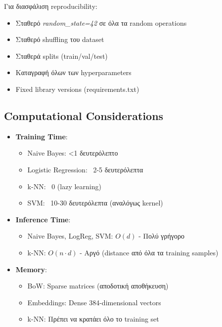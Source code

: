 \documentclass[12pt,a4paper,twoside]{book}
\begin{document}
Για διασφάλιση reproducibility:

\begin{itemize}
    \item Σταθερό \textit{random\_state=42} σε όλα τα random operations
    \item Σταθερό shuffling του dataset
    \item Σταθερά splits (train/val/test)
    \item Καταγραφή όλων των hyperparameters
    \item Fixed library versions (requirements.txt)
\end{itemize}

\subsection{Computational Considerations}

\begin{itemize}
    \item \textbf{Training Time}:
          \begin{itemize}
              \item Naive Bayes: <1 δευτερόλεπτο
              \item Logistic Regression: ~2-5 δευτερόλεπτα
              \item k-NN: ~0 (lazy learning)
              \item SVM: ~10-30 δευτερόλεπτα (αναλόγως kernel)
          \end{itemize}

    \item \textbf{Inference Time}:
          \begin{itemize}
              \item Naive Bayes, LogReg, SVM: \(O(d)\) - Πολύ γρήγορο
              \item k-NN: \(O(n \cdot d)\) - Αργό (distance από όλα τα training samples)
          \end{itemize}

    \item \textbf{Memory}:
          \begin{itemize}
              \item BoW: Sparse matrices (αποδοτική αποθήκευση)
              \item Embeddings: Dense 384-dimensional vectors
              \item k-NN: Πρέπει να κρατάει όλο το training set
          \end{itemize}
\end{itemize}
\end{document}

